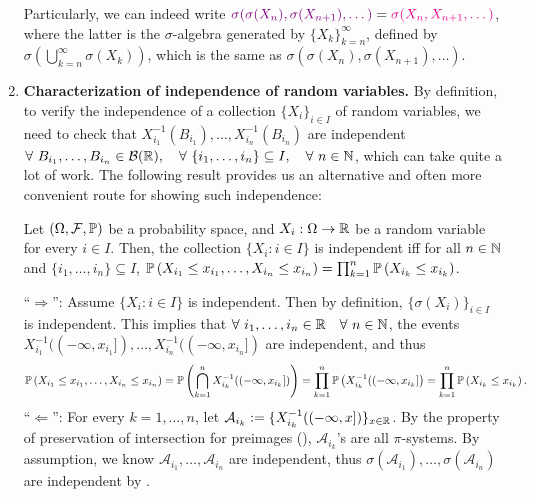 \begin{enumerate}
\begin{remark}
Particularly, we can indeed write \(\vc{\sigma(\sigma(X_n),\sigma(X_{n+1}),\dotsc)}
=\mgc{\sigma(X_n,X_{n+1},\dotsc)}\), where the latter is the \(\sigma\)-algebra
generated by \(\{X_k\}_{k=n}^{\infty}\), defined by
\(\sigma(\bigcup_{k=n}^{\infty}\sigma(X_k))\), which is the same as
\(\sigma(\sigma(X_n),\sigma(X_{n+1}),\dotsc)\).
\end{remark}
\item \textbf{Characterization of independence of random variables.} By
definition, to verify the independence of a collection \(\{X_i\}_{i\in I}\) of
random variables, we need to check that
\(X_{i_1}^{-1}(B_{i_1}),\dotsc,X_{i_n}^{-1}(B_{i_n})\) are independent
\(\forall~B_{i_1},\dotsc,B_{i_n}\in\mathcal{B}(\mathbb{R}),\quad
\forall~\{i_{1},\dotsc,i_{n}\}\subseteq I,\quad \forall~n\in\mathbb{N}\), which can
take quite a lot of work. The following result provides us an alternative and
often more convenient route for showing such independence:

\begin{theorem}
\label{thm:char-rv-ind}
Let \((\Omega,\mathcal{F},\mathbb{P})\) be a probability space, and
\(X_i:\Omega\to\mathbb{R}\) be a random variable for every \(i\in I\). Then, the
collection \(\{X_i:i\in I\}\) is independent iff for all \(n\in\mathbb{N}\) and \(\{i_1,\dotsc,i_n\}\subseteq I\),
\(\mathbb{P}\left(X_{i_1}\le x_{i_1},\dotsc,X_{i_n}\le x_{i_n}\right)=\prod_{k=1}^{n}\mathbb{P}\left(X_{i_k}\le x_{i_k}\right)\).
\end{theorem}
\begin{pf}
``\(\Rightarrow\)'': Assume \(\{X_i:i\in I\}\) is independent. Then by
definition, \(\{\sigma(X_i)\}_{i\in I}\) is independent. This implies that
\(\forall~i_1,\dotsc,i_n\in\mathbb{R}\quad\forall~n\in\mathbb{N}\), the events
\(X_{i_1}^{-1}((-\infty,x_{i_1}]),\dotsc,X_{i_n}^{-1}((-\infty,x_{i_n}])\) are
independent, and thus
\[
\mathbb{P}\left(X_{i_1}\le x_{i_1},\dotsc,X_{i_n}\le x_{i_n}\right)
=\mathbb{P}\left(\bigcap_{k=1}^{n}X_{i_k}^{-1}((-\infty,x_{i_k}])\right)
=\prod_{k=1}^{n}\mathbb{P}\left(X_{i_k}^{-1}((-\infty,x_{i_k}]\right)
=\prod_{k=1}^{n}\mathbb{P}\left(X_{i_k}\le x_{i_k}\right).
\]
``\(\Leftarrow\)'': For every \(k=1,\dotsc,n\), let
\(\mathcal{A}_{i_k}:=\{X_{i_k}^{-1}((-\infty,x])\}_{x\in\mathbb{R}}\).  By the property
of preservation of intersection for preimages (),
\(\mathcal{A}_{i_k}\)'s are all \(\pi\)-systems.  By assumption, we know
\(\mathcal{A}_{i_1},\dotsc,\mathcal{A}_{i_n}\) are independent, thus
\(\sigma(\mathcal{A}_{i_1}),\dotsc,\sigma(\mathcal{A}_{i_n})\) are independent
by .


\end{pf}
\end{enumerate}
